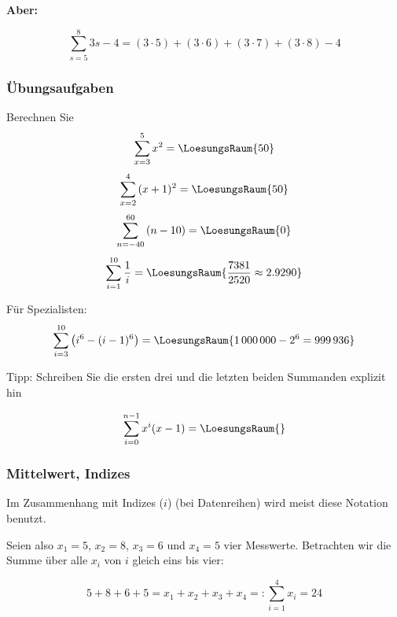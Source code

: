 \textbf{Aber:}

\begin{beispiel}{}{}
  $$\sum_{s=5}^{8}{3s-4} = (3\cdot 5) + (3\cdot 6) + (3\cdot 7) + (3\cdot 8) - 4$$  
\end{beispiel}


\subsubsection{Übungsaufgaben}
Berechnen Sie
$$\sum_{x=3}^5{x^2} = \LoesungsRaum{50}$$
$$\sum_{x=2}^4{(x+1)^2} = \LoesungsRaum{50}$$
$$\sum_{n=-40}^{60}{(n-10)} = \LoesungsRaum{0}$$
$$\sum_{i=1}^{10}{\frac{1}{i}} = \LoesungsRaum{\frac{7381}{2520} \approx 2.9290}$$

Für Spezialisten:
$$\sum_{i=3}^{10}\left(i^6 - ( i-1 )^6\right) = \LoesungsRaum{1\,000\,000 - 2^6 = 999\,936}$$

Tipp: Schreiben Sie die ersten drei und die letzten beiden Summanden
explizit hin

$$\sum_{i=0}^{n-1}x^i(x-1)=\LoesungsRaum{}$$


\newpage



\subsubsection{Mittelwert, Indizes}
Im Zusammenhang mit Indizes ($i$) (\zB bei Datenreihen) wird meist diese
Notation benutzt.

Seien also $x_1=5$, $x_2=8$, $x_3=6$ und $x_4=5$ vier
Messwerte. Betrachten wir die Summe über
alle $x_i$ von $i$ gleich eins bis vier:

$$5+8+6+5 = x_1 + x_2 + x_3 + x_4 =: \sum_{i=1}^4{x_i}=24$$


